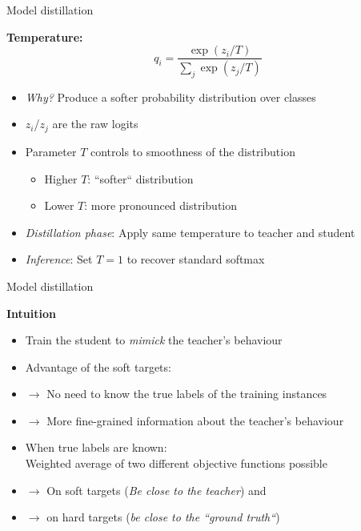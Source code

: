 
\begin{frame}{Model distillation}

\vfill

\textbf{Temperature:}\\$$q_i = \frac{\exp(z_i/T)}{\sum_j \exp(z_j/T)}$$

\begin{itemize}
	\item \textit{Why?} Produce a softer probability distribution over classes
	\item $z_i$/$z_j$ are the raw logits
	\item Parameter $T$ controls to smoothness of the distribution
		\begin{itemize}
			\item Higher $T$: ``softer`` distribution
			\item Lower $T$: more pronounced distribution
		\end{itemize}
	\item \textit{Distillation phase}: Apply same temperature to teacher and student
	\item \textit{Inference}: Set $T = 1$ to recover standard softmax						
\end{itemize}

\vfill

\end{frame}


\begin{frame}{Model distillation}

\vfill

\textbf{Intuition}

\begin{itemize}
	\item Train the student to \textit{mimick} the teacher's behaviour
	\item \ques Advantage of the soft targets:
	\item[] $\to$ No need to know the true labels of the training instances
	\item[] $\to$ More fine-grained information about the teacher's behaviour 
	\item When true labels are known:\\
				Weighted average of two different objective functions possible\\
	\item[] $\to$ On soft targets (\textit{Be close to the teacher}) and 
	\item[] $\to$ on hard targets (\textit{be close to the ``ground truth``})
\end{itemize}

\vfill

\end{frame}

